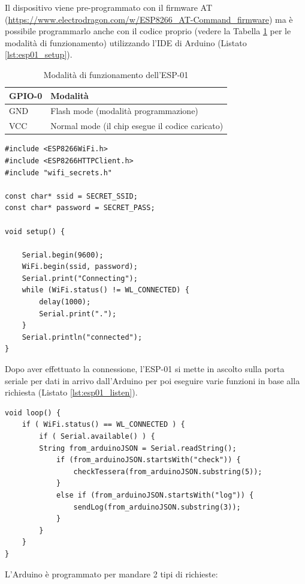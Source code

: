 \documentclass[12pt]{report}
\begin{document}
Il dispositivo viene pre-programmato con il firmware AT  (\url{https://www.electrodragon.com/w/ESP8266\_AT-Command\_firmware}) ma è possibile programmarlo anche con il codice proprio (vedere la Tabella \ref{tab:esp01_modes} per le modalità di funzionamento) utilizzando l'IDE di Arduino (Listato \ref{lst:esp01_setup}).

\begin{table}[H]
	\begin{center}
		\begin{tabular}{l|l} 
			\textbf{GPIO-0} & \textbf{Modalità} \\
			\hline
			GND & Flash mode (modalità programmazione) \\
			VCC & Normal mode (il chip esegue il codice caricato) \\
		\end{tabular}
		\caption{Modalità di funzionamento dell'ESP-01}
		\label{tab:esp01_modes}
	\end{center}
\end{table}
\begin{lstlisting}[caption={Riprogrammazione dell'ESP-01 con il codice proprio. All'accensione, il dispositivo non fa altro che connettersi alla rete WiFi locale. Per poter fare ciò, è stata utilizzata una libreria molto bene documentata (\url{https://arduino-esp8266.readthedocs.io/en/latest/esp8266wifi/readme.html})}, label={lst:esp01_setup}]
#include <ESP8266WiFi.h>
#include <ESP8266HTTPClient.h>
#include "wifi_secrets.h"

const char* ssid = SECRET_SSID;
const char* password = SECRET_PASS;

void setup() {

	Serial.begin(9600);
	WiFi.begin(ssid, password);
	Serial.print("Connecting");
	while (WiFi.status() != WL_CONNECTED) {
		delay(1000);
		Serial.print(".");
	}
	Serial.println("connected");
}
\end{lstlisting}
Dopo aver effettuato la connessione, l'ESP-01 si mette in ascolto sulla porta seriale per dati in arrivo dall'Arduino per poi eseguire varie funzioni in base alla richiesta (Listato \ref{lst:esp01_listen}).

\pagebreak 

\begin{lstlisting}[caption={L'ESP-01 si mette in ascolto sulla porta seriale collegata all'Arduino. Esso chiama la funzione corretta in base al formato della stringa ricevuta.}, label={lst:esp01_listen}]
void loop() {
	if ( WiFi.status() == WL_CONNECTED ) {
		if ( Serial.available() ) {
		String from_arduinoJSON = Serial.readString();
			if (from_arduinoJSON.startsWith("check")) {
				checkTessera(from_arduinoJSON.substring(5));
			}
			else if (from_arduinoJSON.startsWith("log")) {
				sendLog(from_arduinoJSON.substring(3));
			}
		}
	}
}
\end{lstlisting}
L'Arduino è programmato per mandare 2 tipi di richieste:
\end{document}
